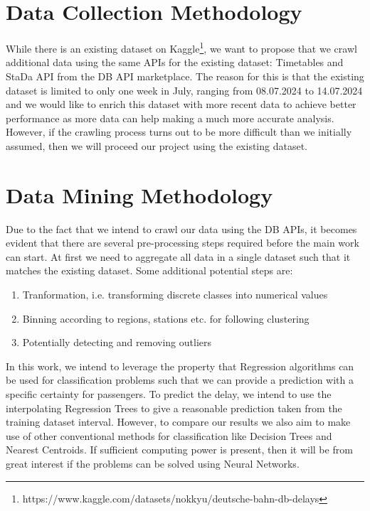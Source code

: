 \documentclass[a4paper,oneside,bibliography=totoc]{scrbook}
\begin{document}
\section{Data Collection Methodology}\label{sec:dataset}
While there is an existing dataset on Kaggle\footnote{https://www.kaggle.com/datasets/nokkyu/deutsche-bahn-db-delays}, we want to propose that we crawl additional data using the same APIs for the existing dataset: Timetables and StaDa API from the DB API marketplace.
The reason for this is that the existing dataset is limited to only one week in July, ranging from 08.07.2024 to 14.07.2024 and we would like to enrich this dataset with more recent data to achieve better performance as more data can help making a much more accurate analysis.
However, if the crawling process turns out to be more difficult than we initially assumed, then we will proceed our project using the existing dataset.

\section{Data Mining Methodology}\label{sec:data-mining-methodology}
Due to the fact that we intend to crawl our data using the DB APIs, it becomes evident that there are several pre-processing steps required before the main work can start. At first we need to aggregate all data in a single dataset such that it matches the existing dataset.
Some additional potential steps are:
\begin{enumerate}
  \item Tranformation, i.e. transforming discrete classes into numerical values
  \item Binning according to regions, stations etc. for following clustering
  \item Potentially detecting and removing outliers
\end{enumerate}

In this work, we intend to leverage the property that Regression algorithms can be used for classification problems such that we can provide a prediction with a specific certainty for passengers. To predict the delay, we intend to
use the interpolating Regression Trees to give a reasonable prediction taken from the training dataset interval. However, to compare our results we also aim to make use of other conventional methods for classification like Decision Trees and Nearest Centroids.
If sufficient computing power is present, then it will be from great interest if the problems can be solved using Neural Networks.
\end{document}
